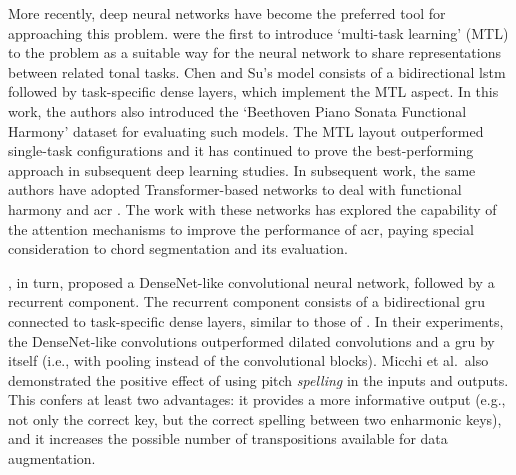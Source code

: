 More recently, deep neural networks have become the
preferred tool for approaching this problem.
\textcite{chen2018functional} were the first to introduce
`multi-task learning' (MTL) \parencite{ruder2017overview} to
the problem as a suitable way for the neural network to
share representations between related tonal tasks. Chen and
Su's model consists of a bidirectional \gls{lstm}
\parencite{hochreiter1997long} followed by task-specific
dense layers, which implement the MTL aspect. In this work,
the authors also introduced the `Beethoven Piano Sonata
Functional Harmony' dataset for evaluating such models. The
MTL layout outperformed single-task configurations and it
has continued to prove the best-performing approach in
subsequent deep learning studies. In subsequent work, the
same authors have adopted Transformer-based networks to deal
with functional harmony and \gls{acr}
\parencite{chen2019harmony, chen2021attend}. The work with
these networks has explored the capability of the attention
mechanisms to improve the performance of \gls{acr}, paying
special consideration to chord segmentation and its
evaluation.

\textcite{micchi2020not}, in turn, proposed a DenseNet-like
\parencite{huang2017densely} convolutional neural network,
followed by a recurrent component. The recurrent component
consists of a bidirectional \gls{gru}
\parencite{cho2014learning} connected to task-specific dense
layers, similar to those of \textcite{chen2018functional}.
In their experiments, the DenseNet-like convolutions
outperformed dilated convolutions and a \gls{gru} by itself
(i.e., with pooling instead of the convolutional blocks).
Micchi et al.~also demonstrated the positive effect of using
pitch \textit{spelling} in the inputs and outputs. This
confers at least two advantages: it provides a more
informative output (e.g., not only the correct key, but the
correct spelling between two enharmonic keys), and it
increases the possible number of transpositions available
for data augmentation.




